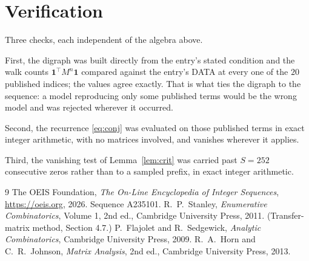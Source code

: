 \documentclass[11pt,a4paper]{article}
\theoremstyle{plain}
\theoremstyle{definition}
\begin{document}
\section{Verification}

Three checks, each independent of the algebra above.

First, the digraph was built directly from the entry's stated condition and the walk counts
$\mathbf{1}^{\!\top}M^{n}\mathbf{1}$ compared against the entry's DATA at every one of
the $20$ published indices; the values agree exactly. That is what ties the digraph to
the sequence: a model reproducing only some published terms would be the wrong model and
was rejected wherever it occurred.

Second, the recurrence \eqref{eq:conj} was evaluated on those published terms in exact
integer arithmetic, with no matrices involved, and vanishes wherever it applies.

Third, the vanishing test of Lemma~\ref{lem:crit} was carried past $S=252$ consecutive
zeros rather than to a sampled prefix, in exact integer arithmetic.

\begin{thebibliography}{9}
 The OEIS Foundation, \emph{The On-Line Encyclopedia of Integer
Sequences}, \url{https://oeis.org}, 2026. Sequence A235101.
 R.~P.~Stanley, \emph{Enumerative Combinatorics}, Volume 1, 2nd ed.,
Cambridge University Press, 2011. (Transfer-matrix method, Section 4.7.)
 P.~Flajolet and R.~Sedgewick, \emph{Analytic Combinatorics}, Cambridge
University Press, 2009.
 R.~A.~Horn and C.~R.~Johnson, \emph{Matrix Analysis}, 2nd ed., Cambridge
University Press, 2013.
\end{thebibliography}
\end{document}
